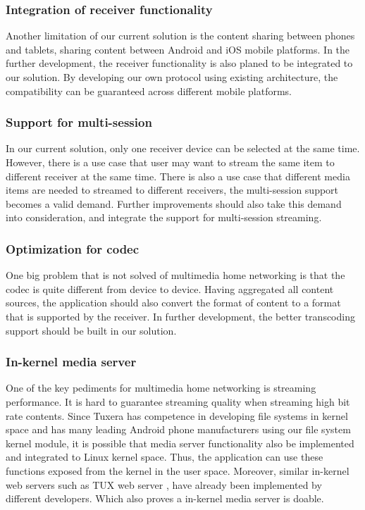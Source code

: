 \subsubsection{Integration of receiver functionality}
Another limitation of our current solution is the content sharing between phones and tablets, sharing content between Android and iOS mobile platforms. In the further development, the receiver functionality is also planed to be integrated to our solution. By developing our own protocol using existing architecture, the compatibility can be guaranteed across different mobile platforms.
\subsubsection{Support for multi-session}
In our current solution, only one receiver device can be selected at the same time. However, there is a use case that user may want to stream the same item to different receiver at the same time. There is also a use case that different media items are needed to streamed to different receivers, the multi-session support becomes a valid demand. Further improvements should also take this demand into consideration, and integrate the support for multi-session streaming.
\subsubsection{Optimization for codec}
One big problem that is not solved of multimedia home networking is that the codec is quite different from device to device. Having aggregated all content sources, the application should also convert the format of content to a format that is supported by the receiver. In further development, the better transcoding support should be built in our solution.
\subsubsection{In-kernel media server}
One of the key pediments for multimedia home networking is streaming performance. It is hard to guarantee streaming quality when streaming high bit rate contents. Since Tuxera has competence in developing file systems in kernel space and has many leading Android phone manufacturers using our file system kernel module, it is possible that media server functionality also be implemented and integrated to Linux kernel space. Thus, the application can use these functions exposed from the kernel in the user space.
Moreover, similar in-kernel web servers such as TUX web server \cite{tux_webserver}, have already been implemented by different developers. Which also proves a in-kernel media server is doable.
